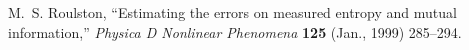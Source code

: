\documentclass[12pt]{article}
\begin{document}

\providecommand{\href}[2]{#2}
\begingroup\raggedright
\begin{thebibliography}{1}

  M.~S. {Roulston},
  ``{Estimating the errors on measured entropy and mutual information},''
  \href{http://dx.doi.org/10.1016/S0167-2789(98)00269-3}{{\em Physica D Nonlinear Phenomena} {\bf 125} (Jan., 1999)  285--294}.

\end{thebibliography}
\endgroup
\end{document}
